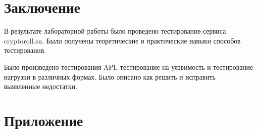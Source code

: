 \documentclass[a4paper, 12pt]{article}
\begin{document}
\newpage
\section{Заключение}

В результате лабораторной работы было проведено тестирование сервиса\\ cryptoroll.su. Были получены теоретические и практические навыки способов тестирования. 

Было произведено тестирования API, тестирование на уязвимость и тестирование нагрузки в различных формах. Было описано как решить и исправить выявленные недостатки.




\newpage
\section{Приложение}
\end{document}
